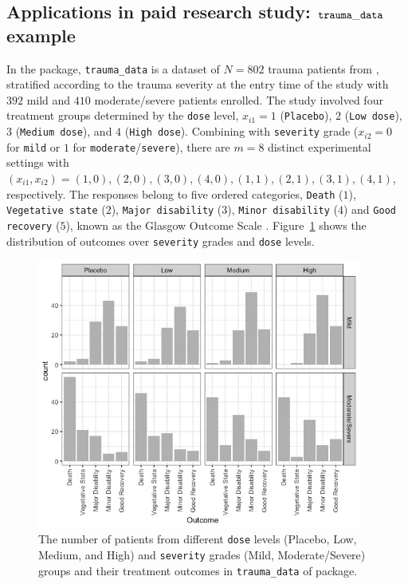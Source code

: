 \subsection{Applications in paid research study: $\tt trauma\_data$ example}\label{sec:MLM_example}
In the  package, \texttt{trauma\_data} is a dataset of $N=802$ trauma patients from \cite{chuang1997}, stratified according to the trauma severity at the entry time of the study with $392$ mild and $410$ moderate/severe patients enrolled. The study involved four treatment groups determined by the {\tt dose} level, $x_{i1} = 1$ ({\tt Placebo}), $2$ ({\tt Low dose}), $3$ ({\tt Medium dose}), and $4$ ({\tt High dose}). Combining with {\tt severity} grade ($x_{i2} = 0$ for {\tt mild} or $1$ for {\tt moderate}/{\tt severe}), there are $m=8$ distinct experimental settings with $(x_{i1}, x_{i2}) = (1,0), (2,0), (3,0), (4,0), (1,1), (2,1), (3,1), (4,1)$, respectively. The responses belong to five ordered categories, {\tt Death} ($1$), {\tt Vegetative state} ($2$), {\tt Major disability} ($3$), {\tt Minor disability} ($4$) and {\tt Good} {\tt recovery} ($5$), known as the Glasgow Outcome Scale \citep{jennett1975}. Figure~\ref{fig:trauma_data} shows the distribution of outcomes over {\tt severity} grades and {\tt dose} levels.
\begin{figure}[htb!]
  \centering
  \includegraphics[width=0.95\textwidth]{figures/trauma_data.png}
  \caption{The number of patients from different {\tt dose} levels (Placebo, Low, Medium, and High) and {\tt severity} grades (Mild, Moderate/Severe) groups and their treatment outcomes in \texttt{trauma\_data} of  package.}
  \label{fig:trauma_data}
\end{figure}
